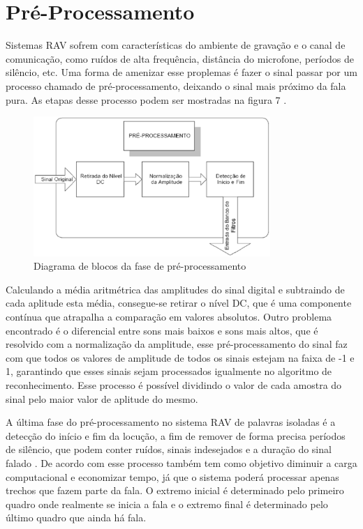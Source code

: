 \section{Pré-Processamento}
Sistemas RAV sofrem com características do ambiente de gravação e o canal de comunicação, como ruídos de alta frequência, distância do microfone, períodos de silêncio, etc. Uma forma de amenizar esse proplemas é fazer o sinal passar por um processo chamado de pré-processamento, deixando o sinal mais próximo da fala pura. As etapas desse processo podem ser mostradas na figura 7 \cite{RavIsolAnderson}. 

\begin{figure}[H]
\includegraphics[width=0.8\textwidth]{graficos/pre_proc.eps}
\caption{Diagrama de blocos da fase de pré-processamento}
\end{figure}

Calculando a média aritmétrica das amplitudes do sinal digital e subtraindo de cada aplitude esta média, consegue-se retirar o nível DC, que é uma componente contínua que atrapalha a comparação em valores absolutos. Outro problema encontrado é o diferencial entre sons mais baixos e sons mais altos, que é resolvido com a normalização da amplitude, esse pré-processamento do sinal faz com que todos os valores de amplitude de todos os sinais estejam na faixa de -1 e 1, garantindo que esses sinais sejam processados igualmente no algoritmo de reconhecimento. Esse processo é possível dividindo o valor de cada amostra do sinal pelo maior valor de aplitude do mesmo. 

A última fase do pré-processamento no sistema RAV de palavras isoladas é a detecção do início e fim da locução, a fim de remover de forma precisa períodos de silêncio, que podem conter ruídos, sinais indesejados e a duração do sinal falado \cite{RavIsolAnderson}. De acordo com  esse processo também tem como objetivo diminuir a carga computacional e economizar tempo, já que o sistema poderá processar apenas trechos que fazem parte da fala.
 O extremo inicial é determinado pelo primeiro quadro onde realmente se inicia a fala e o extremo final é
determinado pelo último quadro que ainda há fala.

